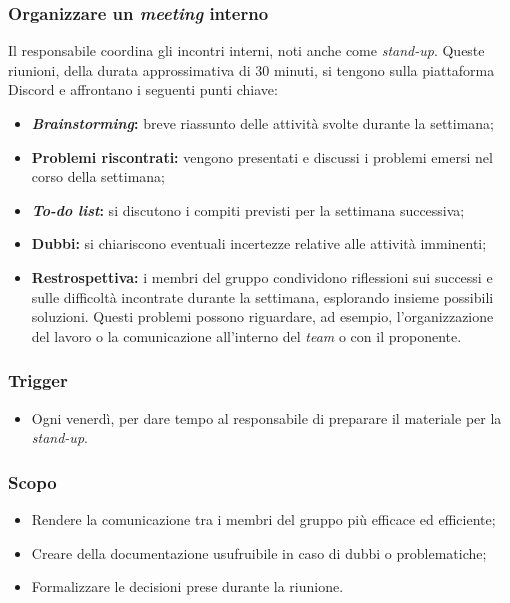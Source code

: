 \subsubsection{Organizzare un \textit{meeting} interno}
\label{organizzare-meeting-interno}

Il responsabile coordina gli incontri interni, noti anche come \textit{stand-up}.
Queste riunioni, della durata approssimativa di 30 minuti, si tengono sulla piattaforma Discord e affrontano i seguenti punti chiave:
\begin{itemize}
	\item \textbf{\textit{Brainstorming}:} breve riassunto delle attività svolte durante la settimana;
	\item \textbf{Problemi riscontrati:} vengono presentati e discussi i problemi emersi nel corso della settimana;
	\item \textbf{\textit{To-do list}:} si discutono i compiti previsti per la settimana successiva;
	\item \textbf{Dubbi:} si chiariscono eventuali incertezze relative alle attività imminenti;
	\item \textbf{Restrospettiva:} i membri del gruppo condividono riflessioni sui successi e sulle difficoltà incontrate durante la settimana, esplorando insieme possibili soluzioni.
		Questi problemi possono riguardare, ad esempio, l'organizzazione del lavoro o la comunicazione all'interno del \textit{team} o con il proponente.
\end{itemize}

\subsubsection*{Trigger}
\begin{itemize}
	\item Ogni venerdì, per dare tempo al responsabile di preparare il materiale
		per la \textit{stand-up}.
\end{itemize}

\subsubsection*{Scopo}
\begin{itemize}
	\item Rendere la comunicazione tra i membri del gruppo più efficace ed
		efficiente;

	\item Creare della documentazione usufruibile in caso di dubbi o
		problematiche;

	\item Formalizzare le decisioni prese durante la riunione.
\end{itemize}

